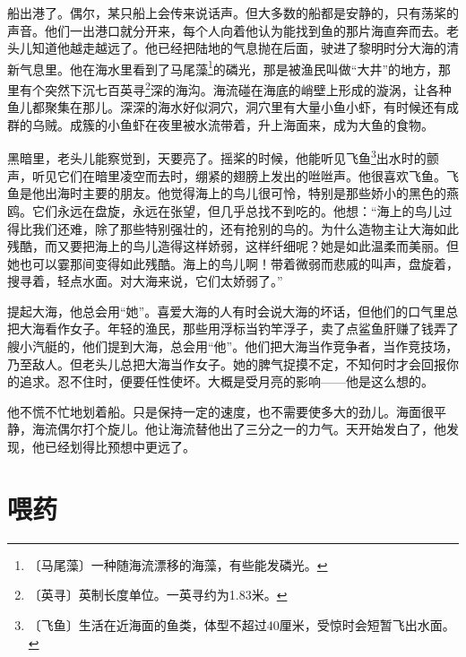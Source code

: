 \documentclass[12pt,UTF-8,openany]{ctexbook}
\begin{document}
\begin{large}
    
    船出港了。偶尔，某只船上会传来说话声。但大多数的船都是安静的，只有荡桨的声音。他们一出港口就分开来，每个人向着他认为能找到鱼的那片海直奔而去。老头儿知道他越走越远了。他已经把陆地的气息抛在后面，驶进了黎明时分大海的清新气息里。他在海水里看到了马尾藻\footnote{〔马尾藻〕一种随海流漂移的海藻，有些能发磷光。}的磷光，那是被渔民叫做“大井”的地方，那里有个突然下沉七百英寻\footnote{〔英寻〕英制长度单位。一英寻约为1.83米。}深的海沟。海流碰在海底的峭壁上形成的漩涡，让各种鱼儿都聚集在那儿。深深的海水好似洞穴，洞穴里有大量小鱼小虾，有时候还有成群的乌贼。成簇的小鱼虾在夜里被水流带着，升上海面来，成为大鱼的食物。
    
    黑暗里，老头儿能察觉到，天要亮了。摇桨的时候，他能听见飞鱼\footnote{〔飞鱼〕生活在近海面的鱼类，体型不超过40厘米，受惊时会短暂飞出水面。}出水时的颤声，听见它们在暗里凌空而去时，绷紧的翅膀上发出的咝咝声。他很喜欢飞鱼。飞鱼是他出海时主要的朋友。他觉得海上的鸟儿很可怜，特别是那些娇小的黑色的燕鸥。它们永远在盘旋，永远在张望，但几乎总找不到吃的。他想：“海上的鸟儿过得比我们还难，除了那些特别强壮的，还有抢别的鸟的。为什么造物主让大海如此残酷，而又要把海上的鸟儿造得这样娇弱，这样纤细呢？她是如此温柔而美丽。但她也可以霎那间变得如此残酷。海上的鸟儿啊！带着微弱而悲戚的叫声，盘旋着，搜寻着，轻点水面。对大海来说，它们太娇弱了。”
    
    提起大海，他总会用“她”。喜爱大海的人有时会说大海的坏话，但他们的口气里总把大海看作女子。年轻的渔民，那些用浮标当钓竿浮子，卖了点鲨鱼肝赚了钱弄了艘小汽艇的，他们提到大海，总会用“他”。他们把大海当作竞争者，当作竞技场，乃至敌人。但老头儿总把大海当作女子。她的脾气捉摸不定，不知何时才会回报你的追求。忍不住时，便要任性使坏。大概是受月亮的影响——他是这么想的。
    
    他不慌不忙地划着船。只是保持一定的速度，也不需要使多大的劲儿。海面很平静，海流偶尔打个旋儿。他让海流替他出了三分之一的力气。天开始发白了，他发现，他已经划得比预想中更远了。
    
\end{large}



\chapter{喂药}
\end{document}
